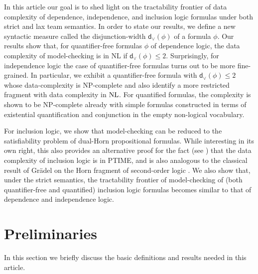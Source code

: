 \documentclass{article}
\theoremstyle{plain}
\theoremstyle{definition}
\newcommand{\nl}{{\rm NL}}
\newcommand{\Disjunctiondepth}[1]{\textsf{d}_{\vee}(#1)}
\begin{document}
In this article our goal is to shed light on  the tractability frontier of data complexity of dependence, independence, and inclusion logic  formulas under both strict and lax team semantics.  In order to state our results, we define  a new syntactic measure called the disjunction-width $\Disjunctiondepth{\phi}$  of a formula $\phi$. Our results show that,  for quantifier-free formulas $\phi$ of dependence logic, the data complexity of model-checking is in NL if $\Disjunctiondepth{\phi}\le 2$. Surprisingly, for independence logic the case of quantifier-free formulas turns out to be  more fine-grained. In particular, we exhibit  a quantifier-free formula  with $\Disjunctiondepth{\phi}\le 2$ whose data-complexity is NP-complete and also identify a more restricted fragment with data complexity in  $\nl$.
For quantified formulas,  the complexity 
is shown to be   NP-complete already with simple formulas constructed in terms of existential quantification and conjunction   in the empty non-logical vocabulary. 

For inclusion logic, we  show that model-checking can be reduced to the satisfiability problem of dual-Horn propositional formulas. While interesting in its own right, this also provides an alternative proof for the fact (see \cite{gallhella13}) that the  data complexity of  inclusion logic is in PTIME, and is also analogous  to the classical result of Gr\"adel on the Horn fragment of second-order logic \cite{DBLP:journals/tcs/Gradel92}.  We  also show that, under the strict semantics, the tractability frontier of model-checking of  (both quantifier-free and quantified) inclusion logic formulas becomes similar to that of  dependence and independence logic.



\section{Preliminaries}
In this section we briefly discuss the basic definitions and results needed in this article.
 
\end{document}
